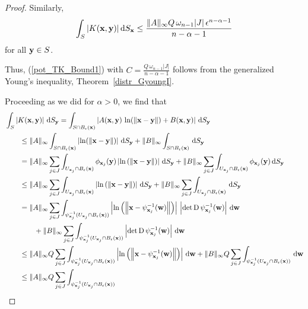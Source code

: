 \begin{proof}
Similarly,
\[
\int_S | K(\mathbf{x},\mathbf{y}) | \,\mathrm{d}{S}_{\mathbf{x}} \leq
\frac{\|A\|_\infty Q\, \omega_{n-1} |J|\, \epsilon^{n-\alpha-1}}{n-\alpha-1}
\]
for all $\mathbf{y} \in S$.

Thus, (\ref{pot_TK_Bound1}) with
$\displaystyle C = \frac{Q\, \omega_{n-1} |J|}{n-\alpha-1}$
follows from the generalized Young's inequality,
Theorem~\ref{distr_GyoungI}.

  Proceeding as we did for $\alpha > 0$, we find
that
\begin{align*}
&\int_S \left| K(\VEC{x},\VEC{y}) \right| \dss{S}{y}
= \int_{S \cap B_\epsilon(\VEC{x})}
\left| A(\VEC{x},\VEC{y}) \,\ln(\|\VEC{x}-\VEC{y}\|) +
B(\VEC{x},\VEC{y}) \right| \dss{S}{y} \\
&\qquad \leq \|A\|_\infty \int_{S \cap B_\epsilon(\VEC{x})}
\left|\ln(\|\VEC{x}-\VEC{y}\|) \right| \dss{S}{y} +
\|B\|_\infty \int_{S \cap B_\epsilon(\VEC{x})}\dss{S}{y} \\
&\qquad = \|A\|_\infty\sum_{j\in J}
\int_{U_{\VEC{x}_j}\cap B_\epsilon(\VEC{x})}
\phi_{\VEC{x}_j}(\VEC{y})
\left| \ln\left( \left\| \VEC{x} - \VEC{y} \right\|\right) \right|
\dss{S}{\VEC{y}} + \|B\|_\infty \sum_{j\in J}
\int_{U_{\VEC{x}_j}\cap B_\epsilon(\VEC{x})} \phi_{\VEC{x}_j}(\VEC{y})
\dss{S}{\VEC{y}} \\
&\qquad \leq \|A\|_\infty\sum_{j\in J}
\int_{U_{\VEC{x}_j}\cap B_\epsilon(\VEC{x})}
\left| \ln\left( \left\| \VEC{x} - \VEC{y} \right\|\right) \right|
\dss{S}{\VEC{y}} + \|B\|_\infty \sum_{j\in J}
\int_{U_{\VEC{x}_j}\cap B_\epsilon(\VEC{x})}\dss{S}{\VEC{y}} \\
&\qquad = \|A\|_\infty\sum_{j\in J}
\int_{\psi_{\VEC{x}_j}^{-1}(U_{\VEC{x}_j}\cap B_\epsilon(\VEC{x}))}
\left| \ln\left( \left\| \VEC{x} - \psi_{\VEC{x}_j}^{-1}(\VEC{w}) 
\right\|\right) \right|\, \left|\det \diff \psi_{\VEC{x}_j}^{-1}(\VEC{w}) \right|
\dx{\VEC{w}} \\
&\qquad \qquad + \|B\|_\infty \sum_{j\in J}
\int_{\psi_{\VEC{x}_j}^{-1}(U_{\VEC{x}_j}\cap B_\epsilon(\VEC{x}))}
\left|\det \diff \psi_{\VEC{x}_j}^{-1}(\VEC{w}) \right| \dx{\VEC{w}} \\
&\qquad \leq \|A\|_\infty Q \sum_{j\in J}
\int_{\psi_{\VEC{x}_j}^{-1}(U_{\VEC{x}_j}\cap B_\epsilon(\VEC{x}))}
\left| \ln\left( \left\| \VEC{x} - \psi_{\VEC{x}_j}^{-1}(\VEC{w}) 
\right\|\right) \right| \dx{\VEC{w}}
+ \|B\|_\infty Q \sum_{j\in J}
\int_{\psi_{\VEC{x}_j}^{-1}(U_{\VEC{x}_j}\cap B_\epsilon(\VEC{x}))} \dx{\VEC{w}} \\
&\qquad \leq \|A\|_\infty Q \sum_{j\in J}
\int_{\psi_{\VEC{x}_j}^{-1}(U_{\VEC{x}_j}\cap B_\epsilon(\VEC{x}))}

\end{align*}
\end{proof}
